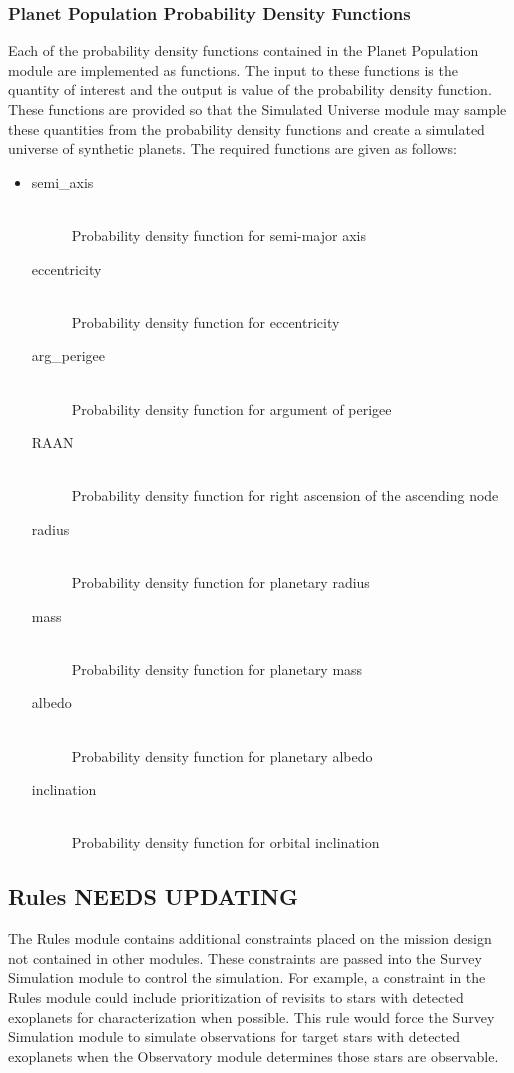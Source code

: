 \documentclass[cleanfoot]{asme2ej}
\begin{document}
\subsubsection{Planet Population Probability Density Functions} \label{sec:pdfs}
Each of the probability density functions contained in the Planet Population module are implemented as functions.  The input to these functions is the quantity of interest and the output is value of the probability density function.  These functions are provided so that the Simulated Universe module may sample these quantities from the probability density functions and create a simulated universe of synthetic planets.  The required functions are given as follows:

\begin{itemize}
    \item 
    \begin{description}
        \item[semi\_axis] \hfill \\
        Probability density function for semi-major axis
        \item[eccentricity] \hfill \\
        Probability density function for eccentricity
        \item[arg\_perigee] \hfill \\
        Probability density function for argument of perigee
        \item[RAAN] \hfill \\
        Probability density function for right ascension of the ascending node
        \item[radius] \hfill \\
        Probability density function for planetary radius
        \item[mass] \hfill \\
        Probability density function for planetary mass
        \item[albedo] \hfill \\
        Probability density function for planetary albedo
        \item[inclination] \hfill \\
        Probability density function for orbital inclination
    \end{description}
\end{itemize}


\subsection{Rules NEEDS UPDATING} \label{sec:rules}
The Rules module contains additional constraints placed on the mission design not contained in other modules. These constraints are passed into the Survey Simulation module to control the simulation. For example, a constraint in the Rules module could include prioritization of revisits to stars with detected exoplanets for characterization when possible. This rule would force the Survey Simulation module to simulate observations for target stars with detected exoplanets when the Observatory module determines those stars are observable.
\end{document}
